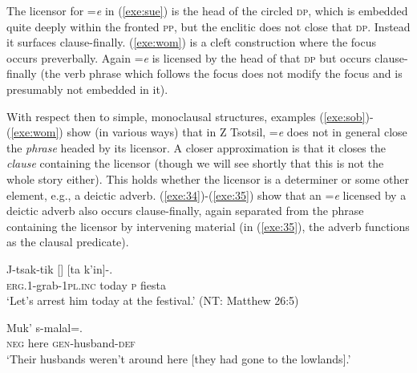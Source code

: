 \documentclass[output=paper,
modfonts
]{LSP/langsci}
\begin{document}
\vspace*{2ex}
The  licensor for =\emph{e} in (\ref{exe:sue}) is the head of the circled \textsc{dp}, which is embedded quite deeply within the fronted \textsc{pp}, but the enclitic  does not close that \textsc{dp}. Instead it surfaces clause-finally.
 (\ref{exe:wom}) is a cleft construction where the focus occurs preverbally. Again =\emph{e} is licensed by
the head of that \textsc{dp} but occurs clause-finally (the verb phrase which follows the focus does not modify the focus and is presumably not embedded in it).

With respect then to simple, monoclausal structures, 
examples (\ref{exe:sob})-(\ref{exe:wom}) show (in various ways) that in Z Tsotsil, =\emph{e} does not in general 
close the \emph{phrase} headed by its licensor. A closer approximation is that it closes the \emph{clause} 
containing the licensor (though we will see shortly that this is not the whole story either). 
This holds whether the licensor is a determiner or some other element, e.g., a deictic adverb.  
(\ref{exe:34})-(\ref{exe:35}) show that an =\emph{e} licensed by 
a deictic adverb also occurs clause-finally, again separated from the phrase containing the licensor by intervening material (in (\ref{exe:35}),
the adverb functions as the clausal predicate).
\begin{exe}
\ex\label{exe:34}\bridgeoverex
\gll J-tsak-tik []  [ta k'in]-. \\
\textsc{erg.1}-grab-\textsc{1pl.inc} today \textsc{p} fiesta \\
\glt `Let's arrest him today at the festival.' (NT: Matthew 26:5)
\end{exe}
\begin{exe}
\ex\label{exe:35}\bridgeoverex
\gll Muk'   s-malal=. \\
\textsc{neg} here \textsc{gen}-husband-\textsc{def} \\
\glt `Their husbands weren't around here [they had gone to the lowlands].' \citep[101]{laughlin1977}
\end{exe}
\end{document}

